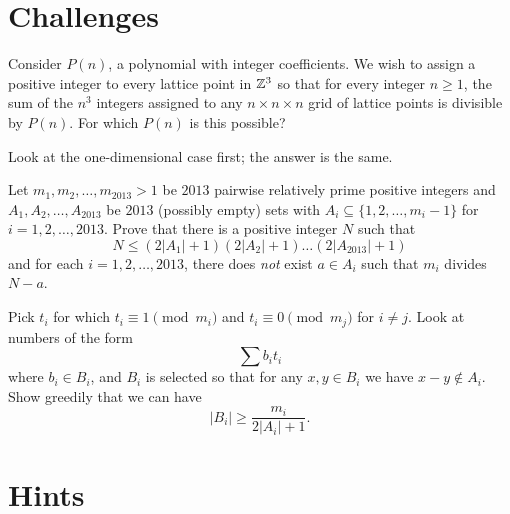\documentclass[11pt]{scrartcl}
\begin{document}
\section{Challenges}
\begin{problem}
  Consider $P(n)$, a polynomial with integer coefficients.
  We wish to assign a positive integer to every lattice point in
  $\mathbb Z^3$ so that for every integer $n \ge 1$,
  the sum of the $n^3$ integers assigned to any $n \times n \times n$ grid
  of lattice points is divisible by $P(n)$.
  For which $P(n)$ is this possible?
  \begin{hint}
    Look at the one-dimensional case first;
    the answer is the same.
  \end{hint}
\end{problem}

\begin{problem}
  Let $m_1,m_2,\ldots,m_{2013} > 1$ be $2013$
  pairwise relatively prime positive integers
  and $A_1,A_2,\ldots,A_{2013}$ be $2013$ (possibly empty) sets
  with $A_i\subseteq \{1,2,\ldots,m_i-1\}$ for $i=1,2,\ldots,2013$.
  Prove that there is a positive integer $N$ such that
   \[ N \le \left( 2\left\lvert A_1 \right\rvert + 1 \right)
     \left( 2\left\lvert A_2 \right\rvert + 1 \right)
     \dots\left( 2\left\lvert A_{2013} \right\rvert + 1 \right) \]
  and for each $i = 1, 2, \ldots, 2013$,
  there does \emph{not} exist $a \in A_i$ such that $m_i$ divides $N-a$.
  \begin{hint}
    Pick $t_i$ for which $t_i \equiv 1 \pmod{m_i}$ and $t_i \equiv 0 \pmod{m_j}$ for $i \neq j$.
    Look at numbers of the form \[ \sum b_i t_i \] where $b_i \in B_i$,
    and $B_i$ is selected so that for any $x,y \in B_i$
    we have $x-y \notin A_i$.
    Show greedily that we can have \[ \left\lvert B_i \right\rvert \ge \frac{m_i}{2\left\lvert A_i \right\rvert+1}. \]
  \end{hint}
\end{problem}


\eject
\section{Hints}
\begin{enumerate}

\end{enumerate}
\end{document}
